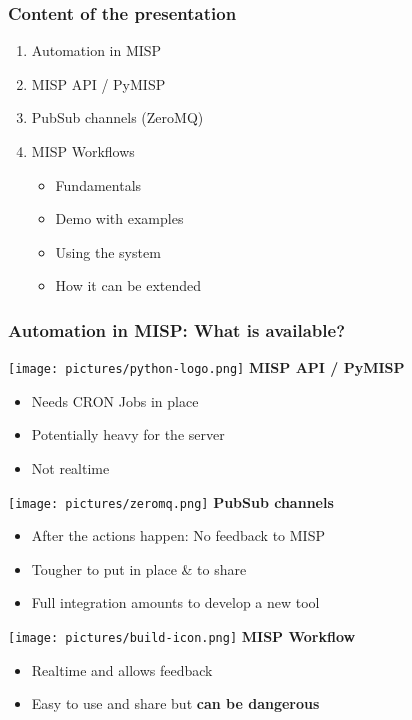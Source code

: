 
\begin{frame}[t,plain]
\titlepage
\end{frame}

\begin{frame}
    \frametitle{Content of the presentation}
    \begin{enumerate}
        \item Automation in MISP
        \item MISP API / PyMISP
        \item PubSub channels (ZeroMQ)
        \item MISP Workflows
        \begin{itemize}
            \item Fundamentals
            \item Demo with examples
            \item Using the system
            \item How it can be extended
        \end{itemize}
    \end{enumerate}
\end{frame}

\begin{frame}
    \frametitle{Automation in MISP: What is available?}
    \texttt{[image: pictures/python-logo.png]}\hspace*{0.5em} \textbf{MISP API / PyMISP}
    \hspace*{0.25em}
    \begin{itemize}
        \item Needs CRON Jobs in place
        \item Potentially heavy for the server
        \item Not realtime
    \end{itemize}
    \vspace*{1em}
    \texttt{[image: pictures/zeromq.png]}\hspace*{0.5em} \textbf{PubSub channels}
    \hspace*{0.25em}
    \begin{itemize}
        \item After the actions happen: No feedback to MISP
        \item Tougher to put in place \& to share
        \item Full integration amounts to develop a new tool
    \end{itemize}
    \vspace*{0.5em}
    \texttt{[image: pictures/build-icon.png]}\hspace*{0.5em} \textbf{MISP Workflow}
    \begin{itemize}
        \item Realtime and allows feedback
        \item Easy to use and share but \textbf{can be dangerous}
    \end{itemize}
    \vspace*{0.5em}
\end{frame}


